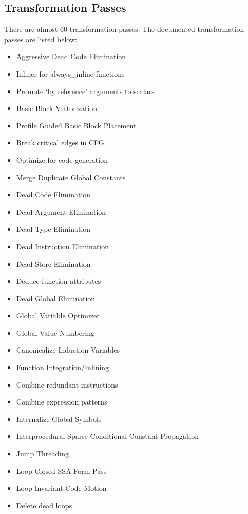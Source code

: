 \subsection{Transformation Passes}
There are almost 60 transformation passes. The documented transformation passes are listed below:

\begin{multicols}{3}
\begin{itemize}
\scriptsize
     \item Aggressive Dead Code Elimination
     \item Inliner for always\_inline functions
     \item Promote ‘by reference’ arguments to scalars
     \item Basic-Block Vectorization
     \item Profile Guided Basic Block Placement
     \item Break critical edges in CFG
     \item Optimize for code generation
     \item Merge Duplicate Global Constants
     \item Dead Code Elimination
     \item Dead Argument Elimination
     \item Dead Type Elimination
     \item Dead Instruction Elimination
     \item Dead Store Elimination
     \item Deduce function attributes
     \item Dead Global Elimination
     \item Global Variable Optimizer
     \item Global Value Numbering
     \item Canonicalize Induction Variables
     \item Function Integration/Inlining
     \item Combine redundant instructions
     \item Combine expression patterns
     \item Internalize Global Symbols
     \item Interprocedural Sparse Conditional Constant Propagation
     \item Jump Threading
     \item Loop-Closed SSA Form Pass
     \item Loop Invariant Code Motion
     \item Delete dead loops

\end{itemize}
\end{multicols}
